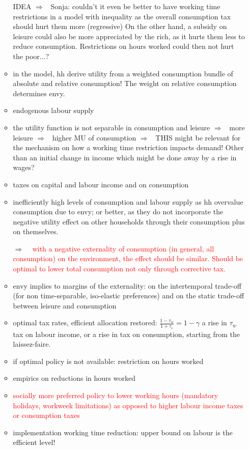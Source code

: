 \documentclass[12pt]{article}
\newcommand{\ar}{$\Rightarrow$ \ }
\newcommand{\tr}[1]{\textcolor{red}{#1}}
\begin{document}
\begin{itemize}
\begin{itemize}
IDEA \ar Sonja: couldn't it even be better to have working time restrictions in a model with inequality as the overall consumption tax should hurt them more (regressive) On the other hand, a subsidy on leisure could also be more appreciated by the rich, as it hurts them less to reduce consumption. Restrictions on hours worked could then not hurt the poor...?
\item in the model, hh derive utility from a weighted consumption bundle of absolute and relative consumption! The weight on relative consumption determines envy.
\item endogenous labour supply
\item the utility function is not separable in consumption and leisure \ar more leisure \ar higher MU of consumption \ar THIS might be relevant for the mechanism on how a working time restriction impacts demand! Other than an initial change in income which might be done away by a rise in wages?
\item taxes on capital and labour income and on consumption
\item inefficiently high levels of consumption and labour supply as hh overvalue consumption due to envy; or better, as they do not incorporate the negative utility effect on other households through their consumption plus on themselves. 
\item[\ar] \tr{with a negative externality of consumption (in general, all consumption) on the environment, the effect should be similar. Should be optimal to lower total consumption not only through corrective tax. }
\item envy implies to margins of the externality: on the intertemporal trade-off (for non time-separable, iso-elastic preferences) and on the static trade-off between leisure and consumption
\item optimal tax rates, efficient allocation restored: $\frac{1-\tau_w}{1+\tau_c}=1-\gamma$ a rise in $\tau_w$ tax on labour income, or a rise in tax on consumption, starting from the laissez-faire. 
\item if optimal policy is not available: restriction on hours worked
\item empirics on reductions in hours worked
\item \tr{socially more preferred policy to lower working hours (mandatory holidays, workweek limitations) as opposed to higher labour income taxes or consumption taxes}
\item implementation working time reduction: upper bound on labour is the efficient level! 

\end{itemize}
\end{itemize}
\end{document}

